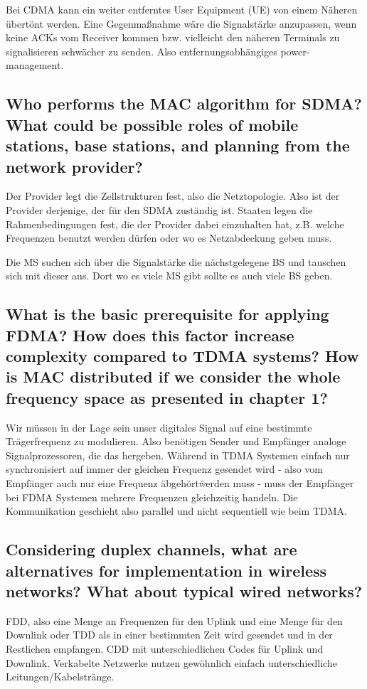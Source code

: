 Bei CDMA kann ein weiter entferntes User Equipment (UE) von einem Näheren übertönt werden. Eine Gegenmaßnahme wäre die Signalstärke anzupassen, wenn keine ACKs vom Receiver kommen bzw. vielleicht den näheren Terminals zu signalisieren schwächer zu senden. Also entfernungsabhängiges power-management.


\subsection{Who performs the MAC algorithm for SDMA? What could be possible roles of mobile
stations, base stations, and planning from the network provider?}

Der Provider legt die Zellstrukturen fest, also die Netztopologie. Also ist der Provider derjenige, der für den SDMA zuständig ist. Staaten legen die Rahmenbedingungen fest, die der Provider dabei einzuhalten hat, z.B. welche Frequenzen benutzt werden dürfen oder wo es Netzabdeckung geben muss.

Die MS suchen sich über die Signalstärke die nächstgelegene BS und tauschen sich mit dieser aus. Dort wo es viele MS gibt sollte es auch viele BS geben.

\subsection{What is the basic prerequisite for applying FDMA? How does this factor increase
complexity compared to TDMA systems? How is MAC distributed if we consider the
whole frequency space as presented in chapter 1?}
Wir müssen in der Lage sein unser digitales Signal auf eine bestimmte Trägerfrequenz zu modulieren. Also benötigen Sender und Empfänger analoge Signalprozessoren, die das hergeben.
Während in TDMA Systemen einfach nur synchronisiert auf immer der gleichen Frequenz gesendet wird - also vom Empfänger auch nur eine Frequenz \"abgehört\" werden muss - muss der Empfänger bei FDMA Systemen mehrere Frequenzen gleichzeitig handeln. Die Kommunikation geschieht also parallel und nicht sequentiell wie beim TDMA. 


\subsection{Considering duplex channels, what are alternatives for implementation in wireless
networks? What about typical wired networks?}
FDD, also eine Menge an Frequenzen für den Uplink und eine Menge für den Downlink oder TDD als in einer bestimmten Zeit wird gesendet und in der Restlichen empfangen.
CDD mit unterschiedlichen Codes für Uplink und Downlink.
Verkabelte Netzwerke nutzen gewöhnlich einfach unterschiedliche Leitungen/Kabelstränge.


